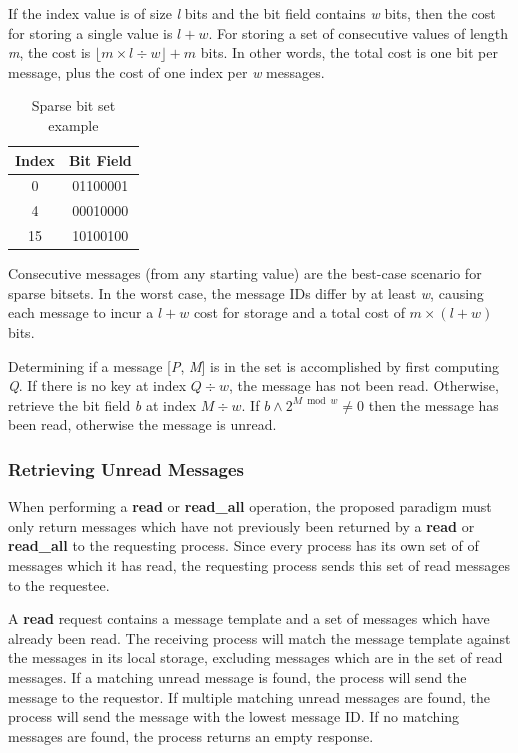 \documentclass[lnicst]{svmultln}
\begin{document}
If the index value is of size \textit{l} bits and the bit field contains \textit{w} bits, then the cost for storing a single value is $l + w$. For storing a set of consecutive values of length \textit{m}, the cost is $\lfloor m \times l \div w\rfloor + m$ bits. In other words, the total cost is one bit per message, plus the cost of one index per \textit{w} messages.

\begin{table}
\centering
\caption{Sparse bit set example}
\begin{tabular}{|c|c|} \hline
Index & Bit Field \\ \hline
0 & 01100001 \\ \hline
4 & 00010000 \\ \hline
15 & 10100100 \\ \hline
\end{tabular}
\label{fig:bitset}
\end{table}

Consecutive messages (from any starting value) are the best-case scenario for sparse bitsets. In the worst case, the message IDs differ by at least \textit{w}, causing each message to incur a $l + w$ cost for storage and a total cost of $m \times (l + w)$ bits.

Determining if a message [\textit{P}, \textit{M}] is in the set is accomplished by first computing \textit{Q}. If there is no key at index $Q \div w$, the message has not been read. Otherwise, retrieve the bit field \textit{b} at index $M \div w$. If $b \wedge 2^{M \bmod w} \neq 0$ then the message has been read, otherwise the message is unread.
    
\subsubsection{Retrieving Unread Messages}

When performing a \textbf{read} or \textbf{read\_all} operation, the proposed paradigm must only return messages which have not previously been returned by a \textbf{read} or \textbf{read\_all} to the requesting process. Since every process has its own set of of messages which it has read, the requesting process sends this set of read messages to the requestee.

A \textbf{read} request contains a message template and a set of messages which have already been read. The receiving process will match the message template against the messages in its local storage, excluding messages which are in the set of read messages. If a matching unread message is found, the process will send the message to the requestor. If multiple matching unread messages are found, the process will send the message with the lowest message ID. If no matching messages are found, the process returns an empty response.
\end{document}
